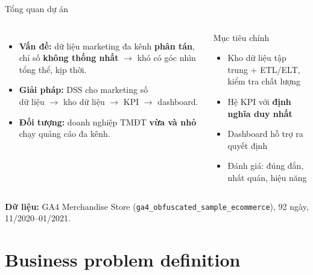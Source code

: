\documentclass[aspectratio=169]{beamer}
\renewcommand{\footnotesize}{\tiny}
\begin{document}
\begin{frame}{Tổng quan dự án}
  \small
  \begin{columns}[T,onlytextwidth]
    \begin{itemize}
      \setlength{\itemsep}{0.5em}
      \item \textbf{Vấn đề:} dữ liệu marketing đa kênh
        \textbf{phân tán}, chỉ số \textbf{không thống nhất}
        $\rightarrow$ khó có góc nhìn tổng thể, kịp thời.
      \item \textbf{Giải pháp:} DSS cho marketing số\\
        dữ liệu $\rightarrow$ kho dữ liệu $\rightarrow$ KPI
        $\rightarrow$ dashboard.
      \item \textbf{Đối tượng:} doanh nghiệp TMĐT
        \textbf{vừa và nhỏ} chạy quảng cáo đa kênh.
    \end{itemize}
    \begin{block}{Mục tiêu chính}
      \scriptsize
      \begin{itemize}
        \setlength{\itemsep}{0.3em}
        \item Kho dữ liệu tập trung + ETL/ELT, kiểm tra chất lượng
        \item Hệ KPI với \textbf{định nghĩa duy nhất}
        \item Dashboard hỗ trợ ra quyết định
        \item Đánh giá: đúng đắn, nhất quán, hiệu năng
      \end{itemize}
    \end{block}
  \end{columns}
  \vfill
  {\footnotesize \textbf{Dữ liệu:} GA4 Merchandise Store
  (\texttt{ga4\_obfuscated\_sample\_ecommerce}), 92 ngày, 11/2020--01/2021.}
\end{frame}

\section{Business problem definition}
\end{document}
